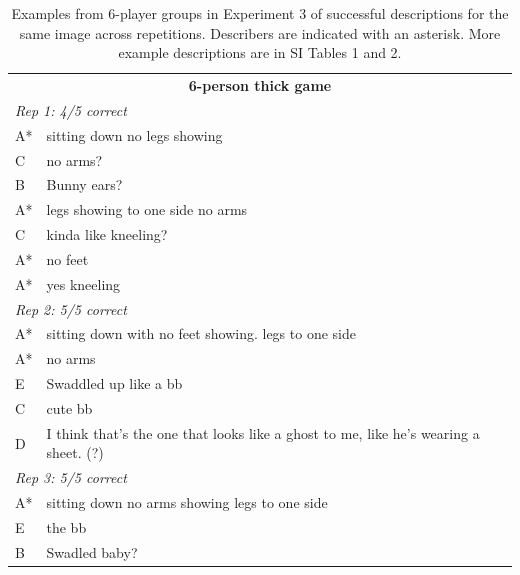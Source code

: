 \documentclass[
  english,
]{article}
\begin{document}
\begin{table}
    \centering

    \caption{Examples from 6-player groups in Experiment 3 of successful descriptions for the same image across repetitions. Describers are indicated with an asterisk. More example descriptions are in SI Tables 1 and 2. \\\label{listener-examples}}
    \begin{subtable}{0.5\linewidth}
        \centering
            \begin{tabular}{lp{2.5in}}
            \hline
            
            \multicolumn{2}{c}{\textbf{6-person thick game}}\\
            \multicolumn{2}{l}{\textit{Rep 1: 4/5 correct}}\\
            A*  &   sitting down no legs showing   \\                
            C   & no arms?\\                       
            B  &    Bunny ears?  \\                                  
            A*  &   legs showing to one side no arms  \\             
            C  &    kinda like kneeling?  \\                         
            A*  &   no feet      \\                                  
            A*   &  yes kneeling  \\
            \multicolumn{2}{l}{\textit{Rep 2: 5/5 correct}}\\
            A*  &   sitting down with no feet showing. legs to one side \\
            A*  &  no arms   \\                                     
            E &      Swaddled up like a bb \\                         
            C  &    cute bb    \\                                    
            D  &    I think that's the one that looks like a ghost to me, like he's wearing a sheet. (?)\\
            \multicolumn{2}{l}{\textit{Rep 3: 5/5 correct}}\\
            A*  &    sitting down no arms showing legs to one side  \\
            E  &   the bb   \\                                      
            B  &  Swadled baby?  \\                                

\end{tabular}
\end{subtable}
\end{table}
\end{document}
